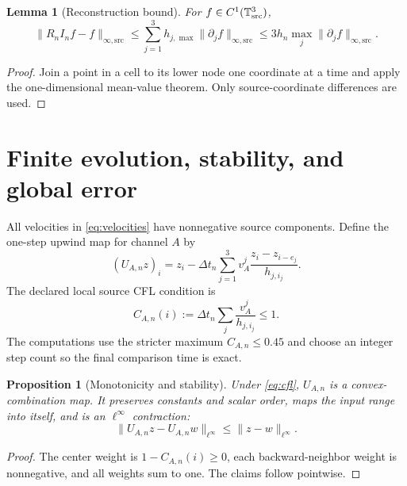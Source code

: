 \documentclass[11pt]{article}
\newcommand{\T}{\mathbb T}
\newtheorem{proposition}{Proposition}
\newtheorem{lemma}{Lemma}
\begin{document}
\begin{lemma}[Reconstruction bound]
For $f\in C^1(\T^3_{\rm src})$,
\begin{equation}
 \|R_nI_nf-f\|_{\infty,\mathrm{src}}
 \le \sum_{j=1}^3h_{j,\max}\|\partial_jf\|_{\infty,\mathrm{src}}
 \le 3h_n\max_j\|\partial_jf\|_{\infty,\mathrm{src}}.
 \label{eq:reconstructionbound}
\end{equation}
\end{lemma}

\begin{proof}
Join a point in a cell to its lower node one coordinate at a time and apply the
one-dimensional mean-value theorem.  Only source-coordinate differences are
used.
\end{proof}

\section{Finite evolution, stability, and global error}

All velocities in \eqref{eq:velocities} have nonnegative source components.
Define the one-step upwind map for channel $A$ by
\begin{equation}
 (U_{A,n}z)_i=z_i-\Delta t_n\sum_{j=1}^3
 v_A^j\frac{z_i-z_{i-e_j}}{h_{j,i_j}}.
 \label{eq:upwind}
\end{equation}
The declared local source CFL condition is
\begin{equation}
 C_{A,n}(i):=\Delta t_n\sum_j\frac{v_A^j}{h_{j,i_j}}\le1.
 \label{eq:cfl}
\end{equation}
The computations use the stricter maximum $C_{A,n}\le0.45$ and choose an
integer step count so the final comparison time is exact.

\begin{proposition}[Monotonicity and stability]
Under \eqref{eq:cfl}, $U_{A,n}$ is a convex-combination map.  It preserves
constants and scalar order, maps the input range into itself, and is an
$\ell^\infty$ contraction:
\begin{equation}
  \|U_{A,n}z-U_{A,n}w\|_{\ell^\infty}
  \le\|z-w\|_{\ell^\infty}.
  \label{eq:stability}
\end{equation}
\end{proposition}

\begin{proof}
The center weight is $1-C_{A,n}(i)\ge0$, each backward-neighbor weight is
nonnegative, and all weights sum to one.  The claims follow pointwise.
\end{proof}
\end{document}
